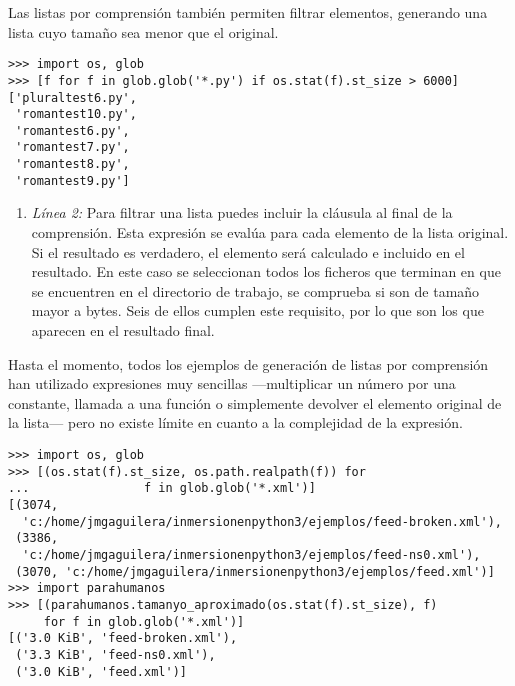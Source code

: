 Las listas por comprensión también permiten filtrar elementos, generando una lista cuyo tamaño sea menor que el original.

\noindent\begin{minipage}{\textwidth}
\begin{lstlisting}[mathescape=True]
>>> import os, glob
>>> [f for f in glob.glob('*.py') if os.stat(f).st_size > 6000]
['pluraltest6.py',
 'romantest10.py',
 'romantest6.py',
 'romantest7.py',
 'romantest8.py',
 'romantest9.py']
\end{lstlisting}
\end{minipage}

\begin{enumerate}

\item \emph{Línea 2:} Para filtrar una lista puedes incluir la cláusula  al final de la comprensión. Esta expresión se evalúa para cada elemento de la lista original. Si el resultado es verdadero, el elemento será calculado e incluido en el resultado. En este caso se seleccionan todos los ficheros que terminan en  que se encuentren en el directorio de trabajo, se comprueba si son de tamaño mayor a  bytes. Seis de ellos cumplen este requisito, por lo que son los que aparecen en el resultado final.

\end{enumerate}

Hasta el momento, todos los ejemplos de generación de listas por comprensión han utilizado expresiones muy sencillas ---multiplicar un número por una constante, llamada a una función o simplemente devolver el elemento original de la lista--- pero no existe límite en cuanto a la complejidad de la expresión.

\noindent\begin{minipage}{\textwidth}
\begin{lstlisting}[mathescape=True]
>>> import os, glob
>>> [(os.stat(f).st_size, os.path.realpath(f)) for 
...                f in glob.glob('*.xml')]
[(3074,
  'c:/home/jmgaguilera/inmersionenpython3/ejemplos/feed-broken.xml'),
 (3386,
  'c:/home/jmgaguilera/inmersionenpython3/ejemplos/feed-ns0.xml'),
 (3070, 'c:/home/jmgaguilera/inmersionenpython3/ejemplos/feed.xml')]
>>> import parahumanos
>>> [(parahumanos.tamanyo_aproximado(os.stat(f).st_size), f) 
     for f in glob.glob('*.xml')]
[('3.0 KiB', 'feed-broken.xml'),
 ('3.3 KiB', 'feed-ns0.xml'),
 ('3.0 KiB', 'feed.xml')]
\end{lstlisting}
\end{minipage}

